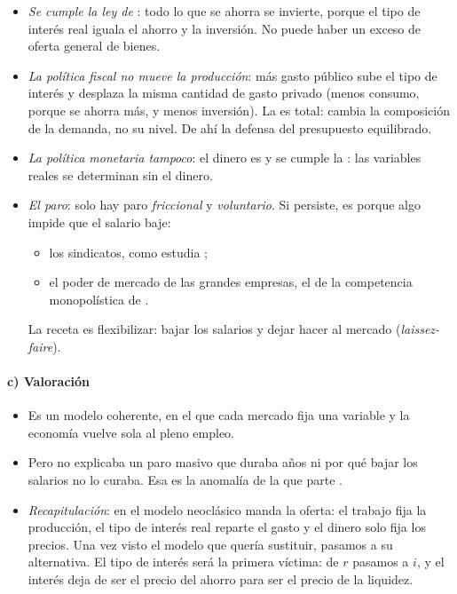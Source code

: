 \documentclass[11pt]{article}
\begin{document}
\begin{itemize}
\item \emph{Se cumple la ley de }: todo lo que se ahorra se invierte, porque el tipo de interés real iguala el ahorro y la inversión. No puede haber un exceso de oferta general de bienes.
\item \emph{La política fiscal no mueve la producción}: más gasto público sube el tipo de interés y desplaza la misma cantidad de gasto privado (menos consumo, porque se ahorra más, y menos inversión). La  es total: cambia la composición de la demanda, no su nivel. De ahí la defensa del presupuesto equilibrado.
\item \emph{La política monetaria tampoco}: el dinero es  y se cumple la : las variables reales se determinan sin el dinero.
\item \emph{El paro}: solo hay paro \emph{friccional} y \emph{voluntario}. Si persiste, es porque algo impide que el salario baje:
  \begin{itemize}
  \item los sindicatos, como estudia \textcite{Hicks1932Theory} ;
  \item el poder de mercado de las grandes empresas, el de la competencia monopolística de \textcite{Chamberlin1933Theory} .
  \end{itemize}
  La receta es flexibilizar: bajar los salarios y dejar hacer al mercado (\emph{laissez-faire}).
\end{itemize}

\paragraph{c) Valoración}

\begin{itemize}
\item Es un modelo coherente, en el que cada mercado fija una variable y la economía vuelve sola al pleno empleo.
\item Pero no explicaba un paro masivo que duraba años ni por qué bajar los salarios no lo curaba. Esa es la anomalía de la que parte .
\item \emph{Recapitulación}: en el modelo neoclásico manda la oferta: el trabajo fija la producción, el tipo de interés real reparte el gasto y el dinero solo fija los precios. Una vez visto el modelo que  quería sustituir, pasamos a su alternativa. El tipo de interés será la primera víctima: de $r$ pasamos a $i$, y el interés deja de ser el precio del ahorro para ser el precio de la liquidez.
\end{itemize}
\end{document}
